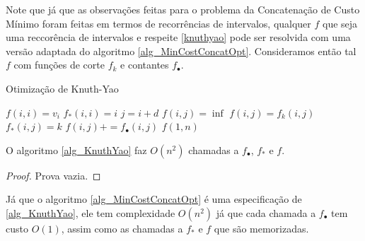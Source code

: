 Note que já que as observações feitas para o problema da Concatenação de Custo Mínimo foram feitas em termos de recorrências de intervalos, qualquer $f$ que seja uma reccorência de intervalos e respeite \ref{knuthyao} pode ser resolvida com uma versão adaptada do algoritmo \ref{alg_MinCostConcatOpt}. Consideramos então tal $f$ com funções de corte $f_k$ e contantes $f_\bullet$.

\begin{algorithm}[H]
\caption{Otimização de Knuth-Yao}
\label{alg_KnuthYao}
\begin{algorithmic}[1]
        \State $f(i,i) = v_i$
        \State $f_*(i,i) = i$
    \EndFor
            \State $j = i+d$
            \State $f(i,j) = \inf$
                    \State $f(i,j) = f_k(i,j)$
                    \State $f_*(i,j) = k$
                \EndIf
            \EndFor
            \State $f(i,j) += f_\bullet(i,j)$
        \EndFor
    \EndFor
    \State \Return $f(1,n)$
\EndFunction
\end{algorithmic}
\end{algorithm}

\begin{prop}
O algoritmo \ref{alg_KnuthYao} faz $O(n^2)$ chamadas a $f_\bullet$, $f_*$ e $f$.
\end{prop}

\begin{proof}
Prova vazia.
\end{proof}

Já que o algoritmo \ref{alg_MinCostConcatOpt} é uma especificação de \ref{alg_KnuthYao}, ele tem complexidade $O(n^2)$ já que cada chamada a $f_\bullet$ tem custo $O(1)$, assim como as chamadas a $f_*$ e $f$ que são memorizadas.

